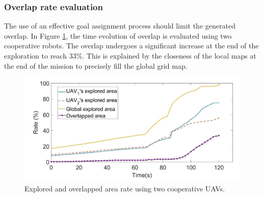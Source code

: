 \documentclass[11pt,openany]{book}
\begin{document}
\subsubsection{Overlap rate evaluation}
The use of an effective goal assignment process should limit the generated overlap. In Figure \ref{fig:3.19}, the time evolution of overlap is evaluated using two cooperative robots. The overlap undergoes a significant increase at the end of the exploration to reach $33\%$. This is explained by the closeness of the local maps at the end of the mission to precisely fill the global grid map.
\begin{figure}[H]
    \centering
    \includegraphics[scale=0.4]{assets/3_19.png}
    \caption{Explored and overlapped area rate using two cooperative UAVs.}
    \label{fig:3.19}
\end{figure}
\end{document}
